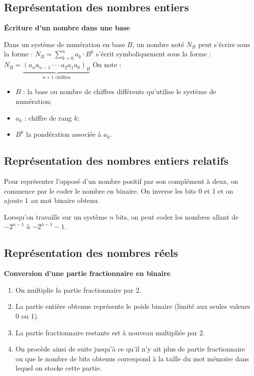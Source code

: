 \documentclass[10pt,fleqn]{article} %
\begin{document}

\vspace{2cm}
\pagestyle{fancy}
\thispagestyle{plain}

\subsection*{Représentation des nombres entiers}
\begin{defi}\textbf{Écriture d'un nombre dans une base}

Dans un système de numération en base $B$, un nombre noté $N_B$ peut s'écrire sous la forme : $N_B = \sum\limits_{k=0}^{n} a_k \cdot B^k $
s'écrit symboliquement sous la forme : 
$
N_B = \underbrace{\left(a_n a_{n-1} \cdot \cdot \cdot a_2 a_1 a_0\right)_B}_{n+1 \text{ chiffres}}
$
On note : 
\begin{itemize}
\item $B$ : la base ou nombre de chiffres différents qu'utilise le système de numération;
\item $a_k$ : chiffre de rang $k$;
\item $B^k$ la pondération associée à $a_k$.
\end{itemize}

\end{defi}

\subsection*{Représentation des nombres entiers relatifs}

\begin{methode} 
Pour représenter l’opposé d’un nombre positif par son complément à deux, on commence par le coder le nombre en binaire. On inverse les bits 0 et 1 et on ajoute 1 au mot binaire obtenu.
\end{methode}
\begin{rem}
Lorsqu'on travaille sur un système $n$ bits, on peut coder les nombres allant de $-2^{n-1}$ à $-2^{n-1}-1$.
\end{rem}

\subsection*{Représentation des nombres réels}
\begin{methode}
\textbf{Conversion d'une partie fractionnaire en binaire}

\begin{enumerate}
\item On multiplie la partie fractionnaire par 2. 
\item La partie entière obtenue représente le poids binaire (limité aux seules valeurs 0 ou 1). 
\item La partie fractionnaire restante est à nouveau multipliée par 2.
\item On procède ainsi de suite jusqu’à ce qu’il n’y ait plus de partie fractionnaire ou que le nombre de bits obtenus correspond à la taille du mot mémoire dans lequel on stocke cette partie.
\end{enumerate}
\end{methode}
\end{document}
